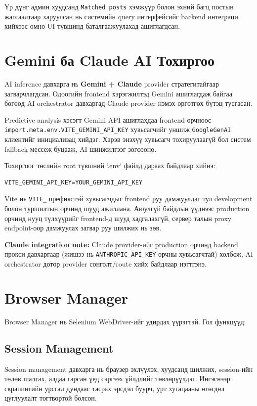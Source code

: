 \documentclass[12pt,a4paper]{report}
\begin{document}
Үр дүнг админ хуудсанд \texttt{Matched posts} хэмжүүр болон эхний багц постын жагсаалтаар харуулсан нь системийн query интерфейсийг backend интеграци хийхээс өмнө UI түвшинд баталгаажуулахад ашиглагдсан.

\section{Gemini ба Claude AI Тохиргоо}

AI inference давхарга нь \textbf{Gemini + Claude} provider стратегитайгаар загварчлагдсан. Одоогийн frontend хэрэгжилтэд Gemini ашиглагдаж байгаа бөгөөд AI orchestrator давхаргад Claude provider нэмэх өргөтгөх бүтэц тусгасан.

Predictive analysis хэсэгт Gemini API ашиглахдаа frontend орчноос \texttt{import.meta.env.VITE\_GEMINI\_API\_KEY} хувьсагчийг уншиж \texttt{GoogleGenAI} клиентийг инициализац хийдэг. Хэрэв энэхүү хувьсагч тохируулаагүй бол систем fallback мессеж буцааж, AI шинжилгээг зогсооно.

Тохиргоог төслийн root түвшний `.env` файлд дараах байдлаар хийнэ:

\begin{verbatim}
VITE_GEMINI_API_KEY=YOUR_GEMINI_API_KEY
\end{verbatim}

Vite нь \texttt{VITE\_} префикстэй хувьсагчдыг frontend руу дамжуулдаг тул development болон туршилтын орчинд шууд ажиллана. Аюулгүй байдлын үүднээс production орчинд нууц түлхүүрийг frontend-д шууд хадгалахгүй, сервер талын proxy endpoint-оор дамжуулах загвар руу шилжих нь зөв.

\textbf{Claude integration note:} Claude provider-ийг production орчинд backend прокси давхаргаар (жишээ нь \texttt{ANTHROPIC\_API\_KEY} орчны хувьсагчтай) холбож, AI orchestrator дотор provider сонголт/route хийх байдлаар нэгтгэнэ.


\section{Browser Manager}

Browser Manager нь Selenium WebDriver-ийг удирдах үүрэгтэй. Гол функцүүд:

\subsection{Session Management}

Session management давхарга нь браузер эхлүүлэх, хуудсанд шилжих, session-ийн төлөв шалгах, алдаа гарсан үед сэргээх үйлдлийг төвлөрүүлдэг. Ингэснээр скрапингийн урсгал дундаас тасрах эрсдэл буурч, урт хугацааны өгөгдөл цуглуулалт тогтвортой болсон.
\end{document}
